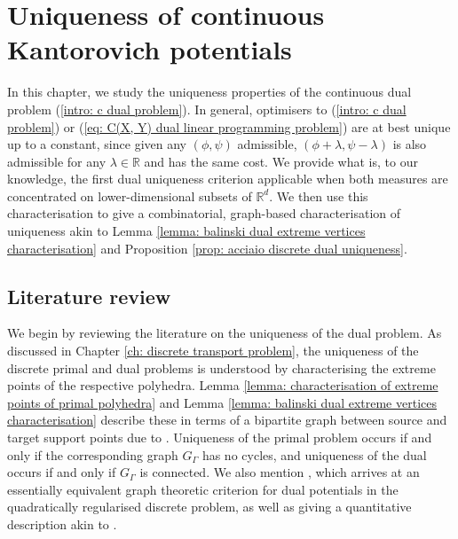 \documentclass[11pt, oneside, titlepage]{book}
\theoremstyle{plain}
\theoremstyle{definition}
\newcommand{\R}{\mathbb{R}}
\begin{document}
\chapter{Uniqueness of continuous Kantorovich potentials}
\label{ch: uniqueness of dual problem}

In this chapter, we study the uniqueness properties of the continuous dual problem (\ref{intro: c dual problem}). In general, optimisers to (\ref{intro: c dual problem})  or (\ref{eq: C(X, Y) dual linear programming problem}) are at best unique up to a constant, since given any $(\phi, \psi)$ admissible, $(\phi + \lambda, \psi - \lambda)$ is also admissible for any $\lambda \in \R$ and has the same cost. We provide what is, to our knowledge, the first dual uniqueness criterion applicable when both measures are concentrated on lower-dimensional subsets of $\R^d$. We then use this characterisation to give a combinatorial, graph-based characterisation of uniqueness akin to Lemma \ref{lemma: balinski dual extreme vertices characterisation} and Proposition \ref{prop: acciaio discrete dual uniqueness}.

\section{Literature review}

We begin by reviewing the literature on the uniqueness of the dual problem. As discussed in Chapter \ref{ch: discrete transport problem}, the uniqueness of the discrete primal and dual problems is understood by characterising the extreme points of the respective polyhedra. Lemma \ref{lemma: characterisation of extreme points of primal polyhedra} and Lemma \ref{lemma: balinski dual extreme vertices characterisation} describe these in terms of a bipartite graph between source and target support points due to \cite{balinski1993signature, acciaio2025characterization}. Uniqueness of the primal problem occurs if and only if the corresponding graph $G_\Gamma$ has no cycles, and uniqueness of the dual occurs if and only if $G_\Gamma$ is connected. We also mention \cite{nutz2025quadratically}, which arrives at an essentially equivalent graph theoretic criterion for dual potentials in the quadratically regularised discrete problem, as well as giving a quantitative description akin to \cite[Theorem 3.9]{acciaio2025characterization}. 
\end{document}
